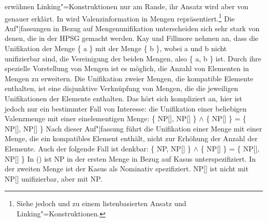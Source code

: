 \mbox{}\citet[]{KF99a}  erwähnen Linking"=Konstruktionen nur am Rande, ihr Ansatz wird aber
von \citet[Kapitel~4]{MR2001a} genauer erklärt. In  wird Valenzinformation
in Mengen repräsentiert.\footnote{
  Siehe jedoch  und  zu einem listenbasierten Ansatz und
  Linking"=Konstruktionen.
}
Die Auf"|fassungen in Bezug auf Mengenunifikation unterscheiden sich sehr
stark von denen, die in der HPSG gemacht werden. Kay und Fillmore nehmen an, dass
die Unifikation der Menge \{ a \} mit der Menge \{ b \}, wobei a und b nicht unifizierbar sind,
die Vereinigung der beiden Mengen, also \{ a, b \} ist.
Durch ihre spezielle Vorstellung von Mengen ist es möglich, die Anzahl von Elementen in Mengen
zu erweitern. Die Unifikation zweier Mengen, die kompatible Elemente enthalten, ist eine disjunktive
Verknüpfung von Mengen, die die jeweiligen Unifikationen der Elemente enthalten. Das hört sich kompliziert
an, hier ist jedoch nur ein bestimmter Fall von Interesse: die Unifikation einer beliebigen
Valenzmenge mit einer einelementigen Menge:
\ea
\{ NP[\nom], NP[\acc] \} $\wedge$ \{ NP[\nom] \} = \{ NP[\nom], NP[\acc] \}
\z
Nach dieser Auf"|fassung führt die Unifikation einer Menge mit einer Menge, die ein kompatibles
Element enthält, nicht zur Erhöhung der Anzahl der Elemente. Auch der folgende Fall ist denkbar:
\ea
\{ NP, NP[\acc] \} $\wedge$ \{ NP[\nom] \} = \{ NP[\nom], NP[\acc] \}
\z
In () ist NP in der ersten Menge in Bezug auf Kasus unterspezifiziert. In der zweiten Menge
ist der Kasus als Nominativ spezifiziert. NP[\nom] ist nicht mit  NP[\acc] unifizierbar, aber mit NP.

